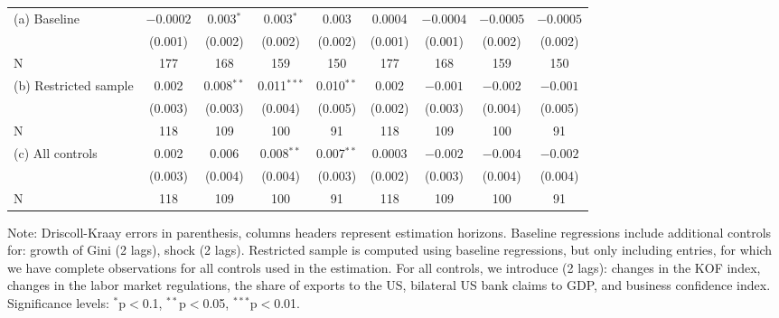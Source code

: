 \documentclass[12pt, a4paper]{article}
\begin{document}
\begin{table}[!htbp]
{\begin{tabular}{@{\extracolsep{5pt}}l cccc || cccc}
(a) Baseline  & $-0.0002$ & 0.003$^{*}$ & 0.003$^{*}$ & 0.003 & 0.0004 & $-0.0004$ & $-0.0005$ & $-0.0005$ \\
 & (0.001) & (0.002) & (0.002) & (0.002) & (0.001) & (0.001) & (0.002) & (0.002) \\ 
N & 177 & 168 & 159 & 150 & 177 & 168 & 159 & 150 \\ [1em]

(b) Restricted sample &  0.002 & 0.008$^{**}$ & 0.011$^{***}$ & 0.010$^{**}$ &  0.002 & $-0.001$ & $-0.002$ & $-0.001$ \\
& (0.003) & (0.003) & (0.004) & (0.005) & (0.002) & (0.003) & (0.004) & (0.005) \\
N & 118 & 109 & 100 & 91 & 118 & 109 & 100 & 91 \\ [1em]

(c) All controls & 0.002 & 0.006 & 0.008$^{**}$ & 0.007$^{**}$ & 0.0003 & $-0.002$ & $-0.004$ & $-0.002$ \\
& (0.003) & (0.004) & (0.004) & (0.003) & (0.002) & (0.003) & (0.004) & (0.004) \\
N & 118 & 109 & 100 & 91 & 118 & 109 & 100 & 91 \\ \hline 

\end{tabular}
}
\begin{minipage}{\textwidth}
    \vspace{0.1cm}
    \footnotesize  Note: Driscoll-Kraay errors in parenthesis, columns headers represent estimation horizons. Baseline regressions include additional controls for: growth of Gini (2 lags), shock (2 lags). Restricted sample is computed using baseline regressions, but only including entries, for which we have complete observations for all controls used in the estimation. For all controls, we introduce (2 lags): changes in the KOF index, changes in the labor market regulations, the share of exports to the US, bilateral US bank claims to GDP, and business confidence index. Significance levels: $^{*}$p$<$0.1, $^{**}$p$<$0.05, $^{***}$p$<$0.01.
\end{minipage}
\end{table}
\end{document}
